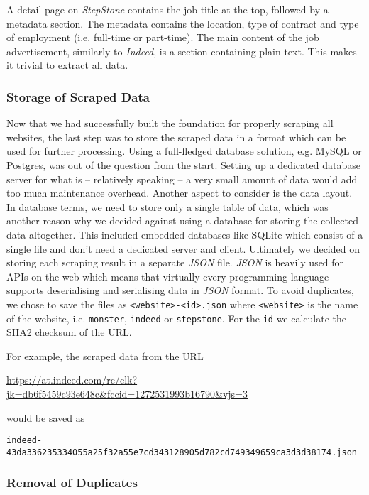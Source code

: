 \documentclass[runningheads]{llncs}
\begin{document}
A detail page on \textit{StepStone} contains the job title at the top, followed by a metadata section. The metadata contains the location, type of contract and type of employment (i.e. full-time or part-time). The main content of the job advertisement, similarly to \textit{Indeed}, is a section containing plain text. This makes it trivial to extract all data.

\subsubsection{Storage of Scraped Data}
\label{subsub:storage_of_scraped_data}

Now that we had successfully built the foundation for properly scraping all websites, the last step was to store the scraped data in a format which can be used for further processing. Using a full-fledged database solution, e.g. MySQL or Postgres, was out of the question from the start. Setting up a dedicated database server for what is -- relatively speaking -- a very small amount of data would add too much maintenance overhead. Another aspect to consider is the data layout.
In database terms, we need to store only a single table of data, which was another reason why we decided against using a database for storing the collected data altogether. This included embedded databases like SQLite which consist of a single file and don't need a dedicated server and client. Ultimately we decided on storing each scraping result in a separate \textit{JSON} file. \textit{JSON} is heavily used for APIs on the web which means that virtually every programming language supports deserialising and serialising data in \textit{JSON} format. To avoid duplicates, we chose to save the files as \texttt{<website>-<id>.json} where \texttt{<website>} is the name of the website, i.e. \texttt{monster}, \texttt{indeed} or \texttt{stepstone}. For the \texttt{id} we calculate the SHA2 checksum of the URL.

For example, the scraped data from the URL

\url{https://at.indeed.com/rc/clk?jk=db6f5459c93e648c&fccid=1272531993b16790&vjs=3}

would be saved as

\texttt{indeed-43da336235334055a25f32a55e7cd343128905d782cd749349659ca3d3d38174.json}

\subsubsection{Removal of Duplicates}
\label{subsub:removal_of_duplicates}
\end{document}
